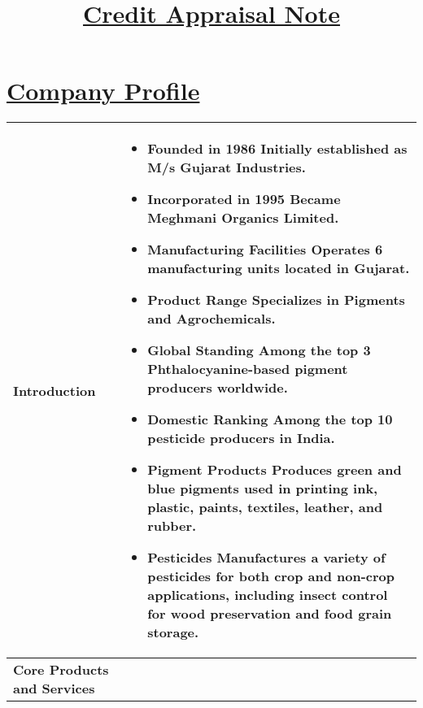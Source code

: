 \documentclass{article}
\title{\textbf{\underline{Credit Appraisal Note}}}
\date{}
\begin{document}
\maketitle

\section*{\underline{Company Profile}}

\begin{longtable}{|m{3cm}|p{14cm}|} %
    \hline
    \multirow{8}{*}{\parbox{3cm}{\centering \textbf{Introduction}}} &
    \begin{itemize}
    \renewcommand\labelitemi{--}
        
        \item Founded in 1986 Initially established as M/s Gujarat Industries.
        
        \item Incorporated in 1995 Became Meghmani Organics Limited.
        
        \item Manufacturing Facilities Operates 6 manufacturing units located in Gujarat.
        
        \item Product Range Specializes in Pigments and Agrochemicals.
        
        \item Global Standing Among the top 3 Phthalocyanine-based pigment producers worldwide.
        
        \item Domestic Ranking Among the top 10 pesticide producers in India.
        
        \item Pigment Products Produces green and blue pigments used in printing ink, plastic, paints, textiles, leather, and rubber.
        
        \item Pesticides Manufactures a variety of pesticides for both crop and non-crop applications, including insect control for wood preservation and food grain storage.
        
    \end{itemize} \\
    \hline
    \multirow{6}{*}{\parbox{3cm}{\centering \textbf{Core Products and Services}}} &
    \begin{itemize}
    \renewcommand\labelitemi{--}
        

\end{itemize}
\end{longtable}
\end{document}
